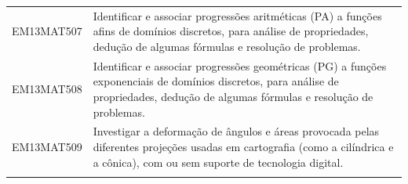 \documentclass[12pt]{extarticle}
\begin{document}
\begin{longtable}{ll}
EM13MAT507 & Identificar e associar progressões aritméticas (PA) a funções afins de domínios discretos, para análise de propriedades, dedução de algumas fórmulas e resolução de problemas.                                                                                                                                                                                                                                                                                                                                                                                                                                                                                                                                                                                                                                        \\
\rowcolor[HTML]{E0F7FA} 
EM13MAT508 & Identificar e associar progressões geométricas (PG) a funções exponenciais de domínios discretos, para análise de propriedades, dedução de algumas fórmulas e resolução de problemas.                                                                                                                                                                                                                                                                                                                                                                                                                                                                                                                                                                                                                                 \\
\rowcolor[HTML]{FFF} 
EM13MAT509 & Investigar a deformação de ângulos e áreas provocada pelas diferentes projeções usadas em cartografia (como a cilíndrica e a cônica), com ou sem suporte de tecnologia digital.                                                                                                                                                                                                                                                                                                                                                                                                                                                                                                                                                                                                                                       \\
\rowcolor[HTML]{E0F7FA} 

\end{longtable}
\end{document}
